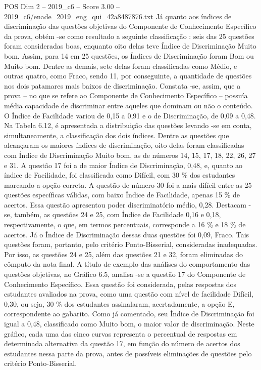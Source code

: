 \begin{textsample}{POS Dim 2 – 2019\_c6 – Score 3.00 – 2019\_c6/enade\_2019\_eng\_qui\_42a8487876.txt}
Já quanto aos índices de discriminação das questões objetivas do Componente de Conhecimento Específico da prova, obtém -se como resultado a seguinte classificação : seis das 25 questões foram consideradas boas, enquanto oito delas teve Índice de Discriminação Muito bom.
Assim, para 14 em 25 questões, os Índices de Discriminação foram Bom ou Muito bom.
Dentre as demais, sete delas foram classificadas como Médio, e outras quatro, como Fraco, sendo 11, por conseguinte, a quantidade de questões nos dois patamares mais baixos de discriminação.
Constata -se, assim, que a prova – no que se refere ao Componente de Conhecimento Específico – possuía média capacidade de discriminar entre aqueles que dominam ou não o conteúdo.
O Índice de Facilidade variou de 0,15 a 0,91 e o de Discriminação, de 0,09 a 0,48.
Na Tabela 6.12, é apresentada a distribuição das questões levando -se em conta, simultaneamente, a classificação dos dois índices.
Dentre as questões que alcançaram os maiores índices de discriminação, oito delas foram classificadas com Índice de Discriminação Muito bom, as de números 14, 15, 17, 18, 22, 26, 27 e 31.
A questão 17 foi a de maior Índice de Discriminação, 0,48, e, quanto ao índice de Facilidade, foi classificada como Difícil, com 30 \% dos estudantes marcando a opção correta.
A questão de número 30 foi a mais difícil entre as 25 questões específicas válidas, com baixo Índice de Facilidade, apenas 15 \% de acertos.
Essa questão apresentou poder discriminatório médio, 0,28.
Destacam -se, também, as questões 24 e 25, com Índice de Facilidade 0,16 e 0,18, respectivamente, o que, em termos percentuais, corresponde a 16 \% e 18 \% de acertos.
Já o Índice de Discriminação dessas duas questões foi 0,09, Fraco.
Tais questões foram, portanto, pelo critério Ponto-Bisserial, consideradas inadequadas.
Por isso, as questões 24 e 25, além das questões 21 e 32, foram eliminadas do cômputo da nota final.
A título de exemplo das análises do comportamento das questões objetivas, no Gráfico 6.5, analisa -se a questão 17 do Componente de Conhecimento Específico.
Essa questão foi considerada, pelas respostas dos estudantes avaliados na prova, como uma questão com nível de facilidade Difícil, 0,30, ou seja, 30 \% dos estudantes assinalaram, acertadamente, a opção E, correspondente ao gabarito.
Como já comentado, seu Índice de Discriminação foi igual a 0,48, classificado como Muito bom, o maior valor de discriminação.
Neste gráfico, cada uma das cinco curvas representa o percentual de respostas em determinada alternativa da questão 17, em função do número de acertos dos estudantes nessa parte da prova, antes de possíveis eliminações de questões pelo critério Ponto-Bisserial.

\end{textsample}
